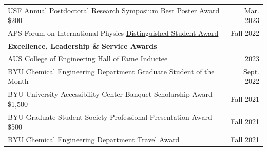 \documentclass[letterpaper,11pt]{article}
\begin{document}
\begin{longtable}{@{}p{}r@{}}
  \hspace{3mm} USF Annual Postdoctoral Research Symposium \href{https://www.usf.edu/postdoctoral-affairs/postdoc-services/postdoc-spotlight.aspx#:~:text=BEST\%20POSTERS\%3A-,Pierre\%20Kawak,-Exploring\%20Mechanisms\%20of}{Best Poster Award} \$200   & Mar. 2023    \\ [4pt]
  \hspace{3mm} APS Forum on International Physics \href{https://engage.aps.org/fip/honors/prizes-awards/ds-program}{Distinguished Student Award}                                                                                                         & Fall 2022    \\ [10pt] %
  \multicolumn{2}{l}{\hspace{-3mm} \bf{Excellence, Leadership \& Service Awards}} 	                                                                                                                                                                                \\ [5pt]
  \hspace{3mm} AUS \href{https://www.aus.edu/cen/community-hub/alumni-hall-of-fame#:~:text=Dr.\%20Pierre-,Kawak,-BS\%27\%2015\%20\%2D\%20Chemical}{College of Engineering Hall of Fame Inductee}                                                         & 2023         \\ [4pt]
  \hspace{3mm} BYU Chemical Engineering Department Graduate Student of the Month                                                                                                                                                                         & Sept. 2022   \\ [4pt]
  \hspace{3mm} BYU University Accessibility Center Banquet Scholarship Award \$1,500                                                                                                                                                                     & Fall 2021    \\ [4pt] %
  \hspace{3mm} BYU Graduate Student Society Professional Presentation Award \$500                                                                                                                                                                        & Fall 2021    \\ [4pt] %
  \hspace{3mm} BYU Chemical Engineering Department Travel Award                                                                                                                                                                                          & Fall 2021    \\ [4pt] %

\end{longtable}
\end{document}
